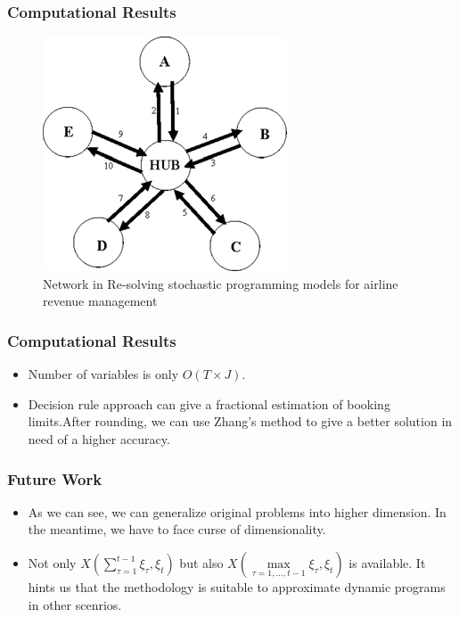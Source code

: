 \documentclass{beamer}
\begin{document}
\begin{frame}
\frametitle{Computational Results}
\begin{figure}
\centering
\includegraphics[width=.5\textwidth]{resolve.png}
\caption{Network in Re-solving stochastic programming models for airline
revenue management}
\end{figure}
\end{frame}
\begin{frame}
\frametitle{Computational Results}
\begin{itemize}
\item
Number of variables is only $O(T\times J)$.
\item
Decision rule approach can give a fractional estimation of booking limits.After rounding, we can use Zhang's method to give a better solution in need of a higher accuracy.
\end{itemize}
\end{frame}
\begin{frame}
\frametitle{Future Work}
\begin{itemize}
\item As we can see, we can generalize original problems into higher dimension. In the meantime, we have to face curse of dimensionality.
\item Not only $X(\sum\limits_{\tau=1}^{t-1} \xi_\tau,\xi_t)$ but also $X(\max\limits_{\tau=1,\ldots,t-1}\xi_\tau,\xi_t)$ is available. It hints us that the
methodology is suitable to approximate dynamic programs in other scenrios.
\end{itemize}
\end{frame}
\end{document}
